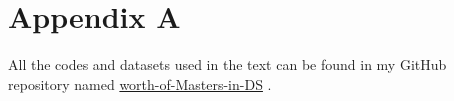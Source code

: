 \chapter{Appendix A}
All the codes and datasets used in the text can be found in my GitHub repository named \href{https://github.com/ARna06/worth-of-Masters-in-DS}{worth-of-Masters-in-DS} \href{https://github.com/ARna06/worth-of-Masters-in-DS}{\faGithubSquare}.
